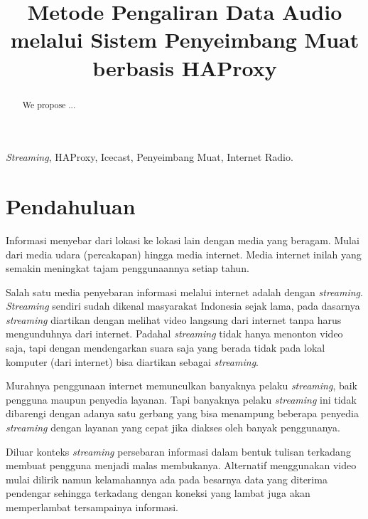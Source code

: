 \documentclass[conference]{IEEEtran}
\begin{document}
	\title{Metode Pengaliran Data Audio melalui Sistem Penyeimbang Muat berbasis HAProxy}
	\author{
		}
	
	\maketitle
	\begin{abstract}
		We propose ...
	\end{abstract}
	\begin{IEEEkeywords}
		\textit{Streaming}, HAProxy, Icecast, Penyeimbang Muat, Internet Radio.
	\end{IEEEkeywords}
	
	

	\section{Pendahuluan}
	Informasi menyebar dari lokasi ke lokasi lain dengan media yang beragam. Mulai dari media udara (percakapan) hingga media internet. Media internet inilah yang semakin meningkat tajam penggunaannya setiap tahun.
	
	\indent
	Salah satu media penyebaran informasi melalui internet adalah dengan \textit{streaming}. \textit{Streaming} sendiri sudah dikenal masyarakat Indonesia sejak lama, pada dasarnya \textit{streaming} diartikan dengan melihat video langsung dari internet tanpa harus mengunduhnya dari internet. Padahal \textit{streaming} tidak hanya menonton video saja, tapi dengan mendengarkan suara saja yang berada tidak pada lokal komputer (dari internet) bisa diartikan sebagai \textit{streaming}.
	
	\indent
	Murahnya penggunaan internet memunculkan banyaknya pelaku \textit{streaming}, baik pengguna maupun penyedia layanan. Tapi banyaknya pelaku \textit{streaming} ini tidak dibarengi dengan adanya satu gerbang yang bisa menampung beberapa penyedia \textit{streaming} dengan layanan yang cepat jika diakses oleh banyak penggunanya.
	
	\indent
	Diluar konteks \textit{streaming} persebaran informasi dalam bentuk tulisan terkadang membuat pengguna menjadi malas membukanya. Alternatif menggunakan video mulai dilirik namun kelamahannya ada pada besarnya data yang diterima pendengar sehingga terkadang dengan koneksi yang lambat juga akan memperlambat tersampainya informasi.
	
\end{document}
